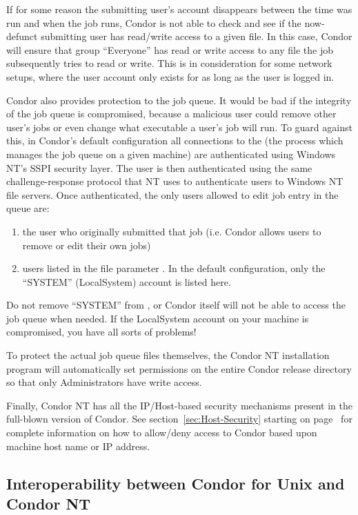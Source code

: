 If for some reason the submitting user's account disappears between the time
 was run and when the job runs, Condor is not able to check
and see if the now-defunct submitting user has read/write access to a given
file.  In this case, Condor will ensure that group ``Everyone'' has read or
write access to any file the job subsequently tries to read or write.  This
is in consideration for some network setups, where the user account only
exists for as long as the user is logged in.

Condor also provides protection to the job queue.  It would be bad if the
integrity of the job queue is compromised, because a malicious user could
remove other user's jobs or even change what executable a user's job will
run.  To guard against this, in Condor's default configuration all connections to the  (the
process which manages the job queue on a given machine) are authenticated
using Windows NT's SSPI security layer.  The user is then authenticated
using the same challenge-response protocol that NT uses to authenticate
users to Windows NT file servers.  Once authenticated, the only users
allowed to edit job entry in the queue are:
\begin{enumerate}
\item the user who originally submitted that job (i.e. Condor allows users
to remove or edit their own jobs)
\item users listed in the  file parameter
.  In the default configuration, only the
``SYSTEM'' (LocalSystem) account is listed here.  
\end{enumerate}
\Warn Do not remove ``SYSTEM'' from , or
Condor itself will not be able to access the job queue when needed.  If the
LocalSystem account on your machine is compromised, you have all sorts of
problems!

To protect the actual job queue files themselves, the Condor NT installation
program will automatically set permissions on the entire Condor release
directory so that only Administrators have write access.

Finally, Condor NT has all the IP/Host-based security mechanisms present
in the full-blown version of Condor.  See section~\ref{sec:Host-Security}
starting on page~\pageref{sec:Host-Security} for complete information
on how to allow/deny access to Condor based upon machine host name or
IP address.

\subsection{Interoperability between Condor for Unix and Condor NT}


